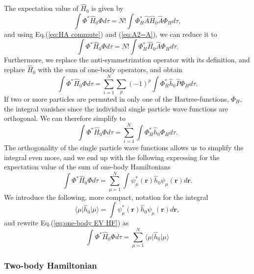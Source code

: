 \documentclass[../main.tex]{subfiles}
\begin{document}
The expectation value of $\hat{H}_0$ is given by
\begin{equation}
    \int \Phi^* \hat{H}_0 \Phi d\tau = N! \int \Phi_H^* \hat{A} \hat{H}_0 \hat{A} \Phi_H d\tau,
\end{equation}
and using Eq.(\ref{eq:HA commute}) and (\ref{eq:A2=A}), we can reduce it to
\begin{equation}
    \int \Phi^* \hat{H}_0 \Phi d\tau = N! \int \Phi_H^* \hat{H}_0 \hat{A} \Phi_H d\tau.
\end{equation}
Furthermore, we replace the anti-symmetrization operator with its definition, and replace $\hat{H}_0$ with the sum of one-body operators, and obtain
\begin{equation}
    \int \Phi^* \hat{H}_0 \Phi d\tau = \sum_{i=1}^N \sum_p (-1)^p \int \Phi_H^* \hat{h}_0 \hat{P} \Phi_H d\tau.
\end{equation}
If two or more particles are permuted in only one of the Hartree-functions, $\Phi_H$, the integral vanishes since the individual single particle wave functions are orthogonal. We can therefore simplify to
\begin{equation}
    \int \Phi^* \hat{H}_0 \Phi d\tau = \sum_{i=1}^N \int \Phi_H^* \hat{h}_0 \Phi_H d\tau.
\end{equation}
The orthogonality of the single particle wave functions allows us to simplify the integral even more, and we end up with the following expressing for the expectation value of the sum of one-body Hamiltonians
\begin{equation}\label{eq:one-body EV HF}
    \int \Phi^* \hat{H}_0 \Phi d\tau = \sum_{\mu=1}^N \int \psi_\mu^*(\mathbf{r}) \hat{h}_0 \psi_\mu(\mathbf{r}) d\mathbf{r}.
\end{equation}
We introduce the following, more compact, notation for the integral
\begin{equation}
    \langle \mu \vert \hat{h}_0 \vert \mu \rangle = \int \psi_\mu^*(\mathbf{r}) \hat{h}_0 \psi_\mu(\mathbf{r}) d\mathbf{r},
\end{equation}
and rewrite Eq.(\ref{eq:one-body EV HF}) as 
\begin{equation}\label{eq:one-body EV HF 2}
    \int \Phi^* \hat{H}_0 \Phi d\tau = \sum_{\mu=1}^N \langle \mu \vert \hat{h}_0 \vert \mu \rangle
\end{equation}

\subsubsection{Two-body Hamiltonian}
\end{document}
